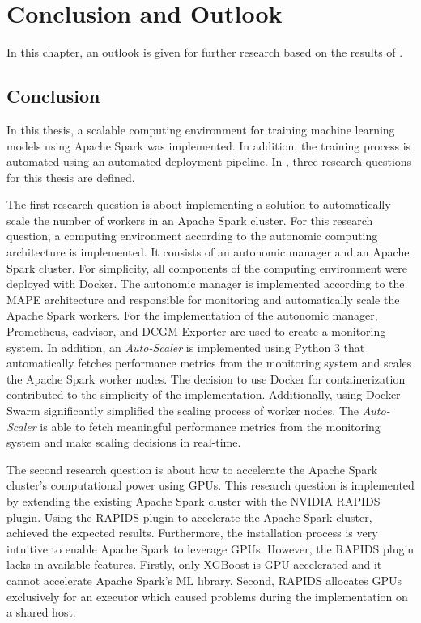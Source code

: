 \chapter{Conclusion and Outlook}
\label{chap:08_conclusion-outlook}

In this chapter, an outlook is given for further research based on the results of .


\section{Conclusion}
\label{sec:08_conclusion}
In this thesis, a scalable computing environment for training machine learning models using Apache Spark was implemented. In addition, the training process is automated using an automated deployment pipeline.
In , three research questions for this thesis are defined.


The first research question is about implementing a solution to automatically scale the number of workers in an Apache Spark cluster.
For this research question, a computing environment according to the autonomic computing architecture is implemented.
It consists of an autonomic manager and an Apache Spark cluster.
For simplicity, all components of the computing environment were deployed with Docker.
The autonomic manager is implemented according to the MAPE architecture and responsible for monitoring and automatically scale the Apache Spark workers.
For the implementation of the autonomic manager, Prometheus, cadvisor, and DCGM-Exporter are used to create a monitoring system.
In addition, an \textit{Auto-Scaler} is implemented using Python 3 that automatically fetches performance metrics from the monitoring system and scales the Apache Spark worker nodes.
The decision to use Docker for containerization contributed to the simplicity of the implementation. Additionally, using Docker Swarm significantly simplified the scaling process of worker nodes. The \textit{Auto-Scaler} is able to fetch meaningful performance metrics from the monitoring system and make scaling decisions in real-time.


The second research question is about how to accelerate the Apache Spark cluster's computational power using GPUs.
This research question is implemented by extending the existing Apache Spark cluster with the NVIDIA RAPIDS plugin.
Using the RAPIDS plugin to accelerate the Apache Spark cluster, achieved the expected results. Furthermore, the installation process is very intuitive to enable Apache Spark to leverage GPUs. However, the RAPIDS plugin lacks in available features. Firstly, only XGBoost is GPU accelerated and it cannot accelerate Apache Spark's ML library. Second, RAPIDS allocates GPUs exclusively for an executor which caused problems during the implementation on a shared host.


